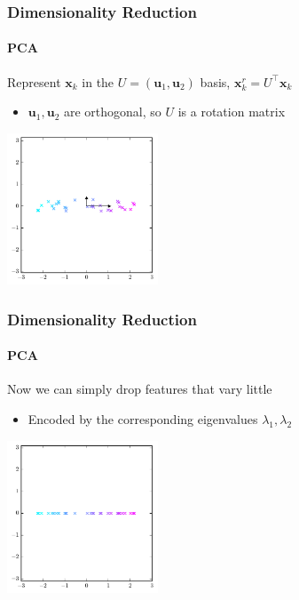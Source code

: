 \documentclass[xetex,professionalfont]{beamer}
\renewcommand{\vec}[1]{\ensuremath{\mathbf{#1}}}
\newcommand{\vu}{\vec{u}}
\newcommand{\vx}{\vec{x}}
\begin{document}

\begin{frame}
\frametitle{Dimensionality Reduction}
\framesubtitle{PCA}

Represent $\vx_k$ in the $U=(\vu_1,\vu_2)$ basis, $\vx^r_k=U^\top\vx_k$
\begin{itemize}
    \item $\vu_1,\vu_2$ are orthogonal, so $U$ is a rotation matrix %
\end{itemize}

\begin{center}
\includegraphics[width=4.5cm]{figures/pca-rotated.pdf}
\end{center}

\end{frame}


\begin{frame}
\frametitle{Dimensionality Reduction}
\framesubtitle{PCA}

Now we can simply drop features that vary little  %
\begin{itemize}
    \item Encoded by the corresponding eigenvalues $\lambda_1,\lambda_2$
\end{itemize}

\begin{center}
\includegraphics[width=4.5cm]{figures/pca-reduced.pdf}
\end{center}

\end{frame}
\end{document}
